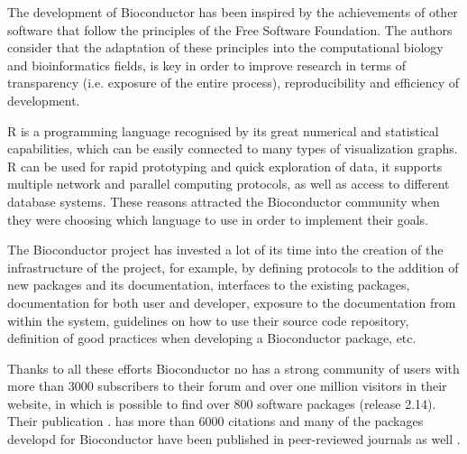 The development of Bioconductor has been inspired by the achievements of other software that follow the principles of the Free Software Foundation. The authors consider that the adaptation of these principles into the computational biology and bioinformatics fields, is key in order to improve research in terms of transparency (i.e. exposure of the entire process), reproducibility and efficiency of development.

R is a programming language recognised by its great numerical and statistical capabilities, which can be easily connected to many types of visualization graphs. R can be used for rapid prototyping and quick exploration of data, it supports multiple network and parallel computing protocols, as well as access to different database systems. These reasons attracted the Bioconductor community when they were choosing which language to use in order to implement their goals.

The Bioconductor project has invested a lot of its time into the creation of the infrastructure of the project, for example, by defining protocols to the addition of new packages and its documentation, interfaces to the existing packages, documentation for both user and developer, exposure to the documentation from within the system, guidelines on how to use their source code repository, definition of good practices when developing a Bioconductor package, etc.

Thanks to all these efforts Bioconductor no has a strong community of users with more than 3000 subscribers to their forum and over one million visitors in their website, in which is possible to find over 800 software packages (release 2.14). Their publication \cite{GEN2004}. has more than 6000 citations and many of the packages developd for Bioconductor have been published in peer-reviewed journals as well \cite{BIO2014}.


